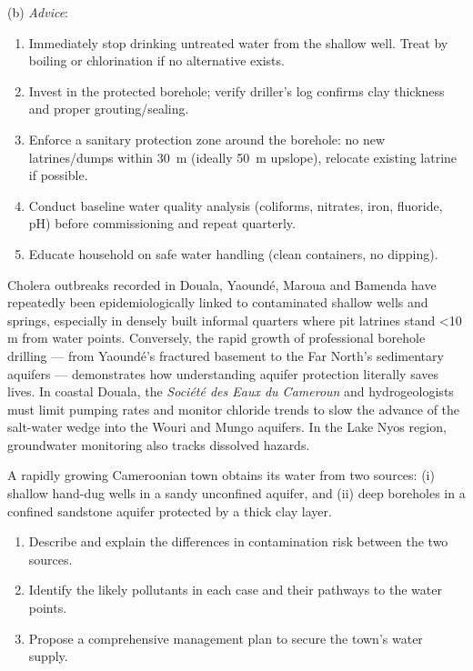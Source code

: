 \documentclass[11pt]{article}
\begin{document}
\begin{exoresolu}
\begin{itemize}
\end{itemize}
(b) \emph{Advice}: 
\begin{enumerate}
\item Immediately stop drinking untreated water from the shallow well. Treat by boiling or chlorination if no alternative exists.
\item Invest in the protected borehole; verify driller's log confirms clay thickness and proper grouting/sealing.
\item Enforce a sanitary protection zone around the borehole: no new latrines/dumps within \SI{30}{m} (ideally \SI{50}{m} upslope), relocate existing latrine if possible.
\item Conduct baseline water quality analysis (coliforms, nitrates, iron, fluoride, pH) before commissioning and repeat quarterly.
\item Educate household on safe water handling (clean containers, no dipping).
\end{enumerate}
\end{exoresolu}

\begin{savaistu}
Cholera outbreaks recorded in Douala, Yaoundé, Maroua and Bamenda have repeatedly been epidemiologically linked to contaminated shallow wells and springs, especially in densely built informal quarters where pit latrines stand \textless 10 m from water points. Conversely, the rapid growth of professional borehole drilling — from Yaoundé's fractured basement to the Far North's sedimentary aquifers — demonstrates how understanding aquifer protection literally saves lives. In coastal Douala, the \emph{Société des Eaux du Cameroun} and hydrogeologists must limit pumping rates and monitor chloride trends to slow the advance of the salt-water wedge into the Wouri and Mungo aquifers. In the Lake Nyos region, groundwater monitoring also tracks dissolved  hazards.
\end{savaistu}

\begin{exercice}
A rapidly growing Cameroonian town obtains its water from two sources: (i) shallow hand-dug wells in a sandy unconfined aquifer, and (ii) deep boreholes in a confined sandstone aquifer protected by a thick clay layer. 
\begin{enumerate}
\item Describe and explain the differences in contamination risk between the two sources.
\item Identify the likely pollutants in each case and their pathways to the water points.
\item Propose a comprehensive management plan to secure the town's water supply.
\end{enumerate}
\end{exercice}
\end{document}
